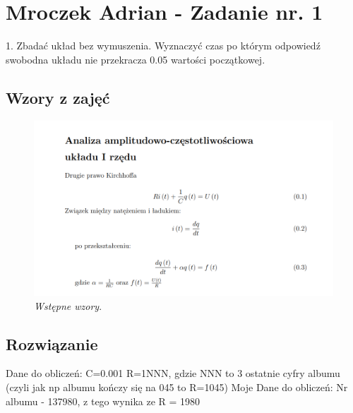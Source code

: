 \documentclass[12pt,oneside,a4paper]{book} %
\begin{document}
% 




\chapter{Mroczek Adrian - Zadanie nr. 1 }

1. Zbadać układ bez wymuszenia. Wyznaczyć czas po którym odpowiedź swobodna układu nie przekracza 0.05 wartości początkowej.
\section{Wzory z zajęć}




\begin{figure}[h]
\begin{center} 
\includegraphics[scale=0.7]{./images/wzorki_wstep.PNG} 
\caption{\textit{Wstępne wzory}.\newline }
\label{rys:logoup}
\end{center}
\end{figure}


\section{Rozwiązanie}
Dane do obliczeń:
C=0.001
R=1NNN, gdzie NNN to 3 ostatnie cyfry albumu (czyli jak np albumu kończy się na 045 to R=1045)
Moje Dane do obliczeń:
Nr albumu - 137980, z tego wynika ze R = 1980  

\end{document}
